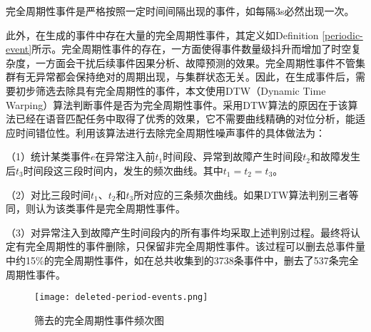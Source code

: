 \begin{definition}[完全周期性事件]
    \label{periodic-event}
    完全周期性事件是严格按照一定时间间隔出现的事件，如每隔3s必然出现一次。
\end{definition}
此外，在生成的事件中存在大量的完全周期性事件，其定义如Definition \ref{periodic-event}所示。完全周期性事件的存在，一方面使得事件数量级抖升而增加了时空复杂度，一方面会干扰后续事件因果分析、故障预测的效果。完全周期性事件不管集群有无异常都会保持绝对的周期出现，与集群状态无关。因此，在生成事件后，需要初步筛选去除具有完全周期性的事件，本文使用DTW（Dynamic Time Warping）算法\cite{mueen2016extracting}判断事件是否为完全周期性事件。采用DTW算法的原因在于该算法已经在语音匹配任务中取得了优秀的效果，它不需要曲线精确的对位分析，能适应时间错位性。利用该算法进行去除完全周期性噪声事件的具体做法为：

（1）统计某类事件$e$在异常注入前$t_1$时间段、异常到故障产生时间段$t_2$和故障发生后$t_{3}$时间段这三段时间内，发生的频次曲线。其中$t_1 = t_2 = t_3$。

（2）对比三段时间$t_1$、$t_2$和$t_{3}$所对应的三条频次曲线。如果DTW算法判别三者等同，则认为该类事件是完全周期性事件。

（3）对异常注入到故障产生时间段内的所有事件均采取上述判别过程。最终将认定有完全周期性的事件删除，只保留非完全周期性事件。该过程可以删去总事件量中约15\%的完全周期性事件，如在总共收集到的3738条事件中，删去了537条完全周期性事件。
\begin{figure}[htbp]
    \centering
    \texttt{[image: deleted-period-events.png]}
    \caption{筛去的完全周期性事件频次图\label{deleted-period-events}}
\end{figure}

